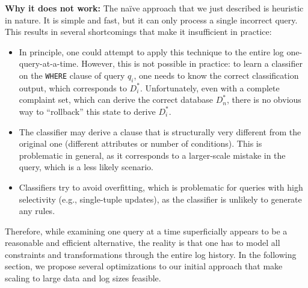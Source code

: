 \smallskip
\noindent
\textbf{Why it does not work:}
The na\"ive approach that we just described is heuristic in nature. It
is simple and fast, but it can only process a single incorrect query.
This results in several shortcomings that make it insufficient in
practice:
\begin{itemize}[itemsep=1pt, leftmargin=5mm]
    
\item In principle, one could attempt to apply this technique to the
entire log one-query-at-a-time. However, this is not possible in
practice: to learn a classifier on the \texttt{WHERE} clause of query
$q_i$, one needs to know the correct classification output, which
corresponds to $D_i^*$. Unfortunately, even with a complete complaint
set, which can derive the correct database $D_n^*$, there is no
obvious way to ``rollback'' this state to derive $D_i^*$.

\item The classifier may derive a clause that is structurally very
different from the original one (different attributes or number of
conditions). This is problematic in general, as it corresponds to a
larger-scale mistake in the query, which is a less likely scenario.

\item Classifiers try to avoid overfitting, which is problematic for
queries with high selectivity (e.g., single-tuple updates), as the
classifier is unlikely to generate any rules.

\end{itemize}


Therefore, while examining one query at a time superficially appears
to be a reasonable and efficient alternative, the reality is that one
has to model all constraints and transformations through the entire
log history. In the following section, we propose several
optimizations to our initial approach that make scaling to large data
and log sizes feasible. 

